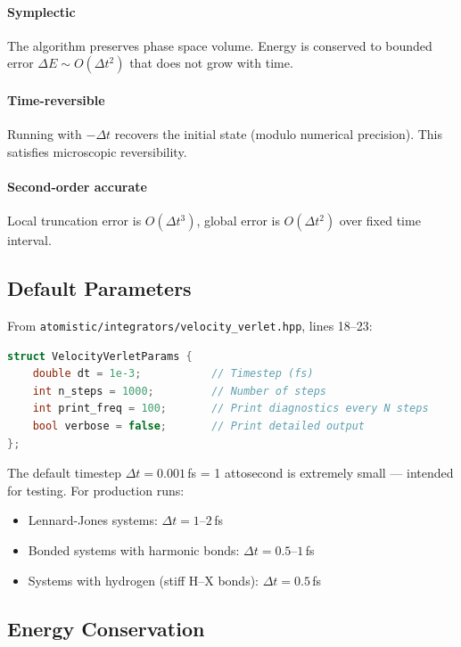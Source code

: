 \documentclass[11pt]{article}
\begin{document}
\paragraph{Symplectic} The algorithm preserves phase space volume. Energy is conserved to bounded error $\Delta E \sim O(\Delta t^2)$ that does not grow with time.

\paragraph{Time-reversible} Running with $-\Delta t$ recovers the initial state (modulo numerical precision). This satisfies microscopic reversibility.

\paragraph{Second-order accurate} Local truncation error is $O(\Delta t^3)$, global error is $O(\Delta t^2)$ over fixed time interval.

\subsection{Default Parameters}

From \texttt{atomistic/integrators/velocity\_verlet.hpp}, lines 18--23:

\begin{lstlisting}[language=C++]
struct VelocityVerletParams {
    double dt = 1e-3;           // Timestep (fs)
    int n_steps = 1000;         // Number of steps
    int print_freq = 100;       // Print diagnostics every N steps
    bool verbose = false;       // Print detailed output
};
\end{lstlisting}

The default timestep $\Delta t = 0.001$\,fs = 1 attosecond is extremely small — intended for testing. For production runs:
\begin{itemize}
\item Lennard-Jones systems: $\Delta t = 1$--$2$\,fs
\item Bonded systems with harmonic bonds: $\Delta t = 0.5$--$1$\,fs
\item Systems with hydrogen (stiff H--X bonds): $\Delta t = 0.5$\,fs
\end{itemize}

\subsection{Energy Conservation}
\end{document}
